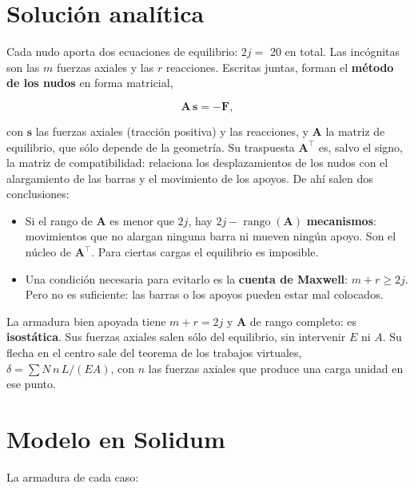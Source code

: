 \documentclass[11pt,oneside]{report}
\begin{document}
\section{Solución analítica}

Cada nudo aporta dos ecuaciones de equilibrio: $2j =$ 20 en total. Las incógnitas son las $m$ fuerzas axiales y las $r$ reacciones. Escritas juntas, forman el \textbf{método de los nudos} en forma matricial,

\[
\mathbf A\,\mathbf s = -\mathbf F ,
\]

con $\mathbf s$ las fuerzas axiales (tracción positiva) y las reacciones, y $\mathbf A$ la matriz de equilibrio, que sólo depende de la geometría. Su traspuesta $\mathbf A^\top$ es, salvo el signo, la matriz de compatibilidad: relaciona los desplazamientos de los nudos con el alargamiento de las barras y el movimiento de los apoyos. De ahí salen dos conclusiones:

\begin{itemize}
  \item Si el rango de $\mathbf A$ es menor que $2j$, hay $2j - \operatorname{rango}(\mathbf A)$ \textbf{mecanismos}: movimientos que no alargan ninguna barra ni mueven ningún apoyo. Son el núcleo de $\mathbf A^\top$. Para ciertas cargas el equilibrio es imposible.
  \item Una condición necesaria para evitarlo es la \textbf{cuenta de Maxwell}: $m + r \ge 2j$. Pero no es suficiente: las barras o los apoyos pueden estar mal colocados.
\end{itemize}

La armadura bien apoyada tiene $m + r = 2j$ y $\mathbf A$ de rango completo: es \textbf{isostática}. Sus fuerzas axiales salen sólo del equilibrio, sin intervenir $E$ ni $A$. Su flecha en el centro sale del teorema de los trabajos virtuales, $\delta = \sum N\,n\,L/(EA)$, con $n$ las fuerzas axiales que produce una carga unidad en ese punto.

\section{Modelo en Solidum}

La armadura de cada caso:
\end{document}
